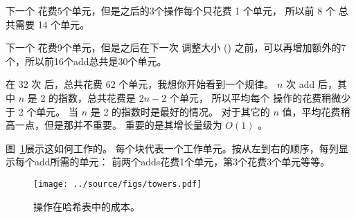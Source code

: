 
下一个  花费5个单元，但是之后的3个操作每个只花费 1 个单元，
所以前 8 个  总共需要 14 个单元。


下一个  花费9个单元，但是之后在下一次 调整大小 ()
之前，可以再增加额外的7个，所以前16个add总共是30个单元。


在 32 次  后，总共花费 62 个单元，我想你开始看到一个规律。
$n$ 次 add 后，其中 $n$ 是 2 的指数，总共花费是 $2n-2$ 个单元，
所以平均每个  操作的花费稍微少于 2 个单元。
当 $n$ 是 2 的指数时是最好的情况。
对于其它的 $n$ 值，平均花费稍高一点，但是那并不重要。
重要的是其增长量级为 $O(1)$ 。


图~\ref{fig.hash}展示这如何工作的。
每个块代表一个工作单元。按从左到右的顺序，每列显示每个add所需的单元：
前两个adds花费1个单元，第3个花费3个单元等等。

\begin{figure}
\centerline{\texttt{[image: ../source/figs/towers.pdf]}}
\caption{  操作在哈希表中的成本。 \label{fig.hash}}
\end{figure}


